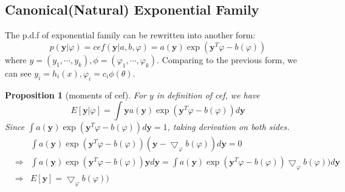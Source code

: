 \documentclass[11pt]{article}
\def\y{{\bm y}}
\newtheorem{proposition}{Proposition}[section]
\begin{document}
\subsection{Canonical(Natural) Exponential Family}
The p.d.f of exponential family can be rewritten into another form:
$$
p(\y|\varphi) = cef(\y|a,b,\varphi) = a(\y)\exp(\y^T\varphi-b(\varphi))
$$
where $y=(y_1,\cdots, y_k), \phi=(\varphi_1, \cdots, \varphi_k)$. Comparing to the previous form, we can see $y_i = h_i(x), \varphi_i = c_i\phi(\theta)$.
\begin{proposition}[moments of cef] For $y$ in definition of cef, we have
$$
E[\y|\varphi] = \int \y a(\y)\exp(\y^T\varphi-b(\varphi))d\y
$$
Since $\int a(\y)\exp(\y^T\varphi-b(\varphi))d\y=1$, taking derivation on both sides.
\begin{eqnarray*}
&&\int a(\y)\exp(\y^T\varphi-b(\varphi))(\y-\bigtriangledown_{\varphi}b(\varphi))d\y = 0\\
&\Longrightarrow&\int a(\y)\exp(\y^T\varphi-b(\varphi))\y d\y = \int a(\y)\exp(\y^T\varphi-b(\varphi))\bigtriangledown_{\varphi}b(\varphi))d\y\\
&\Longrightarrow& E[\y] = \bigtriangledown_{\varphi}b(\varphi))
\end{eqnarray*}
\end{proposition}
\end{document}
